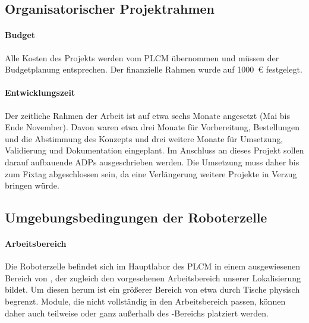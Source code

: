 \subsection{Organisatorischer Projektrahmen}

\paragraph{Budget}
Alle Kosten des Projekts werden vom PLCM übernommen und müssen der Budgetplanung entsprechen. Der finanzielle Rahmen wurde auf \SI{1000}{\euro} festgelegt.

\paragraph{Entwicklungszeit}
Der zeitliche Rahmen der Arbeit ist auf etwa sechs Monate angesetzt (Mai bis Ende November). Davon waren etwa drei Monate für Vorbereitung, Bestellungen und die Abstimmung des Konzepts und drei weitere Monate für Umsetzung, Validierung und Dokumentation eingeplant.
Im Anschluss an dieses Projekt sollen darauf aufbauende ADPs ausgeschrieben werden. Die Umsetzung muss daher bis zum Fixtag abgeschlossen sein, da eine Verlängerung weitere Projekte in Verzug bringen würde.

\subsection{Umgebungsbedingungen der Roboterzelle}

\paragraph{Arbeitsbereich}
Die Roboterzelle befindet sich im Hauptlabor des PLCM in einem ausgewiesenen Bereich von , der zugleich den vorgesehenen Arbeitsbereich unserer Lokalisierung bildet. Um diesen herum ist ein größerer Bereich von etwa  durch Tische physisch begrenzt. Module, die nicht vollständig in den Arbeitsbereich passen, können daher auch teilweise oder ganz außerhalb des -Bereichs platziert werden.


